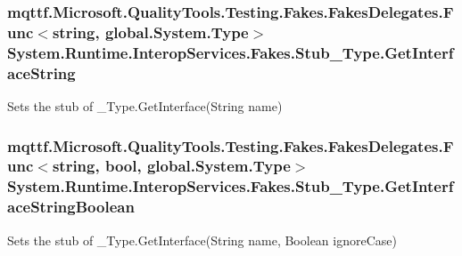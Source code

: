 \hypertarget{class_system_1_1_runtime_1_1_interop_services_1_1_fakes_1_1_stub___type_a41c943432327b94d168a2defc6a64a6d}{
\subsubsection[{Get\-Interface\-String}]{\setlength{\rightskip}{0pt plus 5cm}mqttf.\-Microsoft.\-Quality\-Tools.\-Testing.\-Fakes.\-Fakes\-Delegates.\-Func$<$string, global.\-System.\-Type$>$ System.\-Runtime.\-Interop\-Services.\-Fakes.\-Stub\-\_\-\-Type.\-Get\-Interface\-String}}\label{class_system_1_1_runtime_1_1_interop_services_1_1_fakes_1_1_stub___type_a41c943432327b94d168a2defc6a64a6d}


Sets the stub of \-\_\-\-Type.\-Get\-Interface(\-String name)

\hypertarget{class_system_1_1_runtime_1_1_interop_services_1_1_fakes_1_1_stub___type_a9cbf666bec109caa35719b850d55b8b3}{
\subsubsection[{Get\-Interface\-String\-Boolean}]{\setlength{\rightskip}{0pt plus 5cm}mqttf.\-Microsoft.\-Quality\-Tools.\-Testing.\-Fakes.\-Fakes\-Delegates.\-Func$<$string, bool, global.\-System.\-Type$>$ System.\-Runtime.\-Interop\-Services.\-Fakes.\-Stub\-\_\-\-Type.\-Get\-Interface\-String\-Boolean}}\label{class_system_1_1_runtime_1_1_interop_services_1_1_fakes_1_1_stub___type_a9cbf666bec109caa35719b850d55b8b3}


Sets the stub of \-\_\-\-Type.\-Get\-Interface(\-String name, Boolean ignore\-Case)


